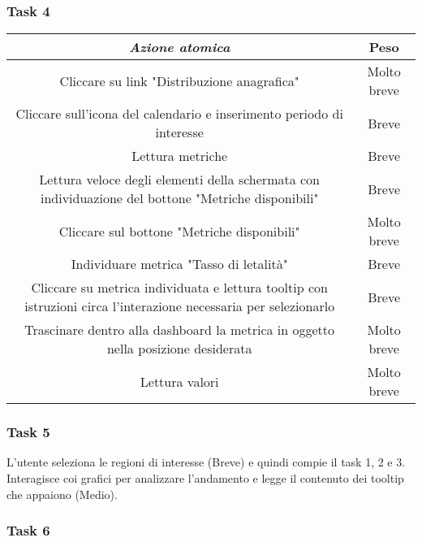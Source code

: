 \subsubsection{Task 4}
\label{sss:iaa-task-4}

{
\renewcommand{\arraystretch}{2}
\begin{longtable}[h]{| c | c |}
    \hline
    \textit{Azione atomica} & \textbf{Peso} \\
    \hline
    \endhead
    Cliccare su link "Distribuzione anagrafica" & Molto breve \\
    \hline
    Cliccare sull'icona del calendario e inserimento periodo di interesse & Breve  \\
    \hline
    Lettura metriche & Breve \\
    \hline
    Lettura veloce degli elementi della schermata con individuazione del bottone "Metriche disponibili" & Breve \\
    \hline
    Cliccare sul bottone "Metriche disponibili" & Molto breve \\
    \hline
    Individuare metrica "Tasso di letalità"  & Breve \\
    \hline
    Cliccare su metrica individuata e lettura tooltip con istruzioni circa l'interazione necessaria per selezionarlo & Breve \\
    \hline
    Trascinare dentro alla dashboard la metrica in oggetto nella posizione desiderata & Molto breve \\
    \hline
    Lettura valori & Molto breve \\
    \hline
\end{longtable}
}

\subsubsection{Task 5}
\label{sss:iaa-task-5}

L'utente seleziona le regioni di interesse (Breve) e quindi compie il task 1, 2 e 3.
Interagisce coi grafici per analizzare l'andamento e legge il contenuto dei tooltip che appaiono (Medio).

\subsubsection{Task 6}
\label{sss:iaa-task-6}


